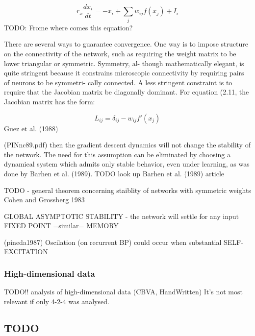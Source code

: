 $$r_x\frac{dx_i}{dt} = -x_i + \sum_j w_{ij} f(x_j) + I_i$$
TODO: Frome where comes this equation? 

There are several ways to guarantee convergence. One way is to
impose structure on the connectivity of the network, such as requiring
the weight matrix to be lower triangular or symmetric. Symmetry, al-
though mathematically elegant, is quite stringent because it constrains
microscopic connectivity by requiring pairs of neurons to be symmetri-
cally connected. A less stringent constraint is to require that the Jacobian
matrix be diagonally dominant. For equation (2.11, the Jacobian matrix
has the form: 

$$L_{ij} = \delta_{ij} - w_{ij}f'(x_j)$$
Guez et al. (1988) 

(PINnc89.pdf) then the gradient descent dynamics will not change the stability of the network. The need
for this assumption can be eliminated by choosing a dynamical system
which admits only stable behavior, even under learning, as was done by
Barhen et al. (1989). TODO look up Barhen et al. (1989) article 

TODO - general theorem concerning staiblity of networks with symmetric weights Cohen and Grossberg 1983 

GLOBAL ASYMPTOTIC STABILITY - the network will settle for any input 
FIXED POINT =similar= MEMORY

(pineda1987) Oscilation (on recurrent BP) could occur when substantial SELF-EXCITATION 

\subsubsection{High-dimensional data} 
TODO!! analysis of high-dimensional data (CBVA, HandWritten) 
It's not most relevant if only 4-2-4 was analysed. 

\subsection{TODO} 

